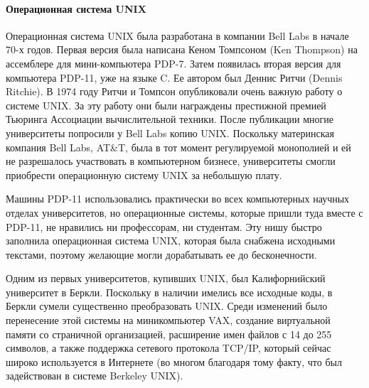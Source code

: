 \documentclass[11pt]{article}
\begin{document}
	\paragraph{Операционная система UNIX}
	Операционная система UNIX была разработана в компании Bell Labs в начале 70-х годов. Первая версия была написана Кеном Томпсоном (Ken Thompson) на ассемблере для мини-компьютера PDP-7. Затем появилась вторая версия для компьютера PDP-11, уже на языке C. Ее автором был Деннис Ритчи (Dennis Ritchie). В 1974 году Ритчи и Томпсон опубликовали очень важную работу о системе UNIX. За эту работу они были награждены престижной премией Тьюринга Ассоциации вычислительной техники. После публикации многие университеты попросили у Bell Labs копию UNIX. Поскольку материнская компания Bell Labs, AT\&T, была в тот момент регулируемой монополией и ей не разрешалось участвовать в компьютерном бизнесе, университеты смогли приобрести операционную систему UNIX за небольшую плату.

	Машины PDP-11 использовались практически во всех компьютерных научных отделах университетов, но операционные системы, которые  пришли туда вместе с PDP-11, не нравились ни профессорам, ни студентам. Эту нишу быстро заполнила операционная система UNIX, которая была снабжена исходными текстами, поэтому желающие могли дорабатывать ее до бесконечности.

	Одним из первых университетов, купивших UNIX, был Калифорнийский университет в Беркли. Поскольку в наличии имелись все исходные коды, в Беркли сумели существенно преобразовать UNIX. Среди изменений было перенесение этой системы на миникомпьютер VAX, создание виртуальной памяти со страничной организацией, расширение имен файлов с 14 до 255 символов, а также поддержка сетевого протокола TCP/IP, который сейчас широко используется в  Интернете (во многом благодаря тому факту, что был задействован в системе Berkeley UNIX).
\end{document}
